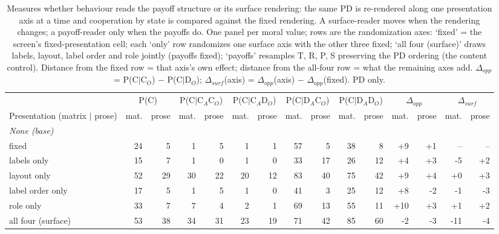 \begin{table}[t]
\centering
\caption{Measures whether behaviour reads the payoff structure or its surface rendering: the same PD is re-rendered along one presentation axis at a time and cooperation by state is compared against the fixed rendering. A surface-reader moves when the rendering changes; a payoff-reader only when the payoffs do. One panel per moral value; rows are the randomization axes: `fixed' = the screen's fixed-presentation cell; each `only' row randomizes one surface axis with the other three fixed; `all four (surface)' draws labels, layout, label order and role jointly (payoffs fixed); `payoffs' resamples T, R, P, S preserving the PD ordering (the content control). Distance from the fixed row = that axis's own effect; distance from the all-four row = what the remaining axes add. $\Delta_{opp}$ = P(C$\mid$C$_O$) $-$ P(C$\mid$D$_O$); $\Delta_{surf}$(axis) = $\Delta_{opp}$(axis) $-$ $\Delta_{opp}$(fixed). PD only.}
\label{tab:randomization-ablation}
\small
\setlength{\tabcolsep}{3.5pt}
\begin{tabular}{lrrrrrrrrrrrrrr}
\toprule
 & \multicolumn{2}{c}{P(C)} & \multicolumn{2}{c}{P(C$\mid$C$_A$C$_O$)} & \multicolumn{2}{c}{P(C$\mid$C$_A$D$_O$)} & \multicolumn{2}{c}{P(C$\mid$D$_A$C$_O$)} & \multicolumn{2}{c}{P(C$\mid$D$_A$D$_O$)} & \multicolumn{2}{c}{$\Delta_{opp}$} & \multicolumn{2}{c}{$\Delta_{surf}$} \\
\cmidrule(lr){2-3}\cmidrule(lr){4-5}\cmidrule(lr){6-7}\cmidrule(lr){8-9}\cmidrule(lr){10-11}\cmidrule(lr){12-13}\cmidrule(lr){14-15}
Presentation (matrix $\mid$ prose) & mat. & prose & mat. & prose & mat. & prose & mat. & prose & mat. & prose & mat. & prose & mat. & prose \\
\midrule
\multicolumn{15}{l}{\emph{None (base)}} \\
fixed & 24 & 5 & 1 & 5 & 1 & 1 & 57 & 5 & 38 & 8 & +9 & +1 & -- & -- \\
labels only & 15 & 7 & 1 & 0 & 1 & 0 & 33 & 17 & 26 & 12 & +4 & +3 & -5 & +2 \\
layout only & 52 & 29 & 30 & 22 & 20 & 12 & 83 & 40 & 75 & 42 & +9 & +4 & +0 & +3 \\
label order only & 17 & 5 & 1 & 5 & 1 & 0 & 41 & 3 & 25 & 12 & +8 & -2 & -1 & -3 \\
role only & 33 & 7 & 7 & 4 & 2 & 1 & 69 & 13 & 55 & 11 & +10 & +3 & +1 & +2 \\
all four (surface) & 53 & 38 & 34 & 31 & 23 & 19 & 71 & 42 & 85 & 60 & -2 & -3 & -11 & -4 \\

\end{tabular}
\end{table}
